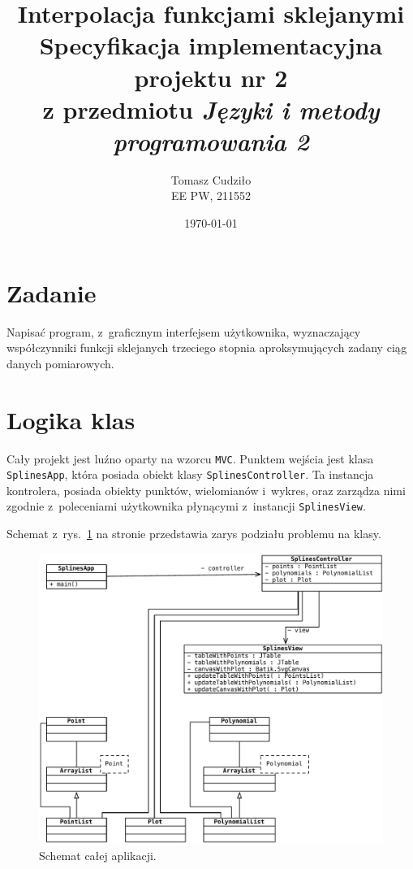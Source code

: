 \documentclass[10pt,a4paper]{article}
\newcommand{\f}[1]{\texttt{#1}}
\begin{document}
\title{ 
  Interpolacja funkcjami sklejanymi\\
  {\normalsize Specyfikacja implementacyjna projektu nr 2}\\\vspace{-12pt}
  {\normalsize z przedmiotu \emph{Języki i metody programowania 2}}
}
\author{
  Tomasz Cudziło\\
  {\small EE PW, 211552}
}
\date{\today}
\maketitle

\section*{Zadanie}
\label{sec:zadanie}

Napisać program, z~graficznym interfejsem użytkownika, wyznaczający
współczynniki funkcji sklejanych trzeciego stopnia aproksymujących zadany ciąg
danych pomiarowych.

\vspace{20pt}

\section{Logika klas}

Cały projekt jest luźno oparty na wzorcu \f{MVC}. Punktem wejścia jest klasa
\f{SplinesApp}, która posiada obiekt klasy \f{SplinesController}. Ta
instancja kontrolera, posiada obiekty punktów, wielomianów i~wykres, oraz
zarządza nimi zgodnie z~poleceniami użytkownika płynącymi z~instancji
\f{SplinesView}.

Schemat z~rys.~\ref{fig:aplikacja} na stronie \pageref{fig:aplikacja}
przedstawia zarys podziału problemu na klasy.

\newpage
\begin{figure}[ht]
  \begin{adjustwidth}{-3cm}{-3cm}
    \centering
    \includegraphics{figury/aplikacja}
    \caption{Schemat całej aplikacji.}
    \label{fig:aplikacja}
  \end{adjustwidth}
\end{figure}
\clearpage
\end{document}
